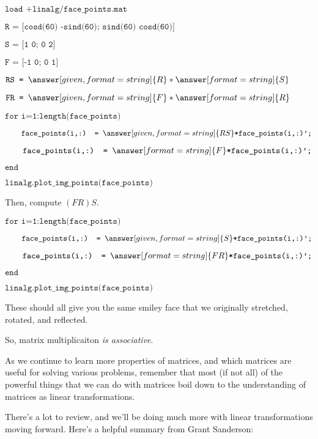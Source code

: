 \documentclass{ximera}
\begin{document}
\begin{exploration}
\begin{example}
        \vspace{1cm}


$\texttt{load +linalg/face\_points.mat}$

$\texttt{R = [cosd(60) -sind(60); sind(60) cosd(60)]}$

$\texttt{S = [1 0; 0 2]}$

$\texttt{F = [-1 0; 0 1]}$

$\texttt{RS = }\answer[given,format=string]{R}*\answer[format=string]{S}$

$\texttt{FR = }\answer[given,format=string]{F}*\answer[format=string]{R}$

$\texttt{for i=1:length(face\_points)}$

$\qquad \texttt{face\_points(i,:) = }\answer[given,format=string]{RS}\texttt{*face\_points(i,:)';}$

$\qquad \texttt{face\_points(i,:) = }\answer[format=string]{F}\texttt{*face\_points(i,:)';}$

$\texttt{end}$

$\texttt{linalg.plot\_img\_points(face\_points)}$

\vspace{1cm}

        Then, compute $(FR)S$.

        \vspace{1cm}

$\texttt{for i=1:length(face\_points)}$

$\qquad \texttt{face\_points(i,:) = }\answer[given,format=string]{S}\texttt{*face\_points(i,:)';}$

$\qquad \texttt{face\_points(i,:) = }\answer[format=string]{FR}\texttt{*face\_points(i,:)';}$

$\texttt{end}$

$\texttt{linalg.plot\_img\_points(face\_points)}$

\vspace{1cm}

These should all give you the same smiley face that we originally stretched, rotated, and reflected.

So, matrix multiplicaiton \emph{is associative}.

    \end{example}

\end{exploration}

\begin{remark}

    As we continue to learn more properties of matrices, and which matrices are useful for solving various problems, remember that most (if not all) of the powerful things that we can do with matrices boil down to the understanding of matrices as linear transformations.

\end{remark}

There's a lot to review, and we'll be doing much more with linear transformations moving forward. Here's a helpful summary from Grant Sanderson:

\end{document}
